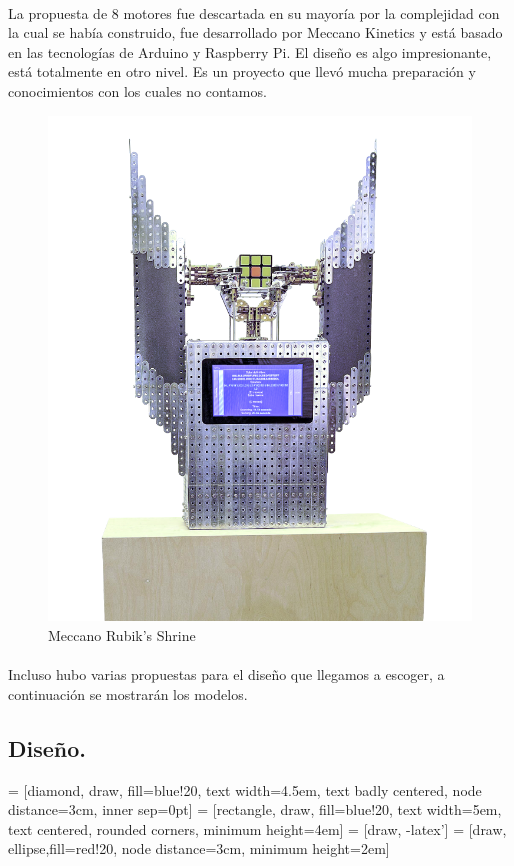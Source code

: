 \documentclass[12pt, letterpaper]{article}
\begin{document}
\paragraph{}
La propuesta de 8 motores fue descartada en su mayoría por la complejidad con la cual se había construido, fue desarrollado por Meccano Kinetics y está basado en las tecnologías de Arduino y Raspberry Pi. El diseño es algo impresionante, está totalmente en otro nivel. Es un proyecto que llevó mucha preparación y conocimientos con los cuales no contamos.
\begin{figure}[!ht]
	\centering
	\includegraphics[width=0.3\linewidth]{images/prop2.png}
	\caption{Meccano Rubik's Shrine} \label{fig:prop2}
\end{figure}
\paragraph{}
Incluso hubo varias propuestas para el diseño que llegamos a escoger, a continuación se mostrarán los modelos.
\subsection{Diseño.}

 = [diamond, draw, fill=blue!20, 
    text width=4.5em, text badly centered, node distance=3cm, inner sep=0pt]
 = [rectangle, draw, fill=blue!20, 
    text width=5em, text centered, rounded corners, minimum height=4em]
 = [draw, -latex']
 = [draw, ellipse,fill=red!20, node distance=3cm,
    minimum height=2em]
    
\end{document}
